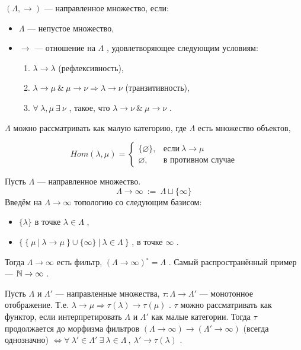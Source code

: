 \SSendp

\pagebreak

\SSsect[def] \( (\Lambda,\rightarrow) \) --- направленное множество, если:
\begin{itemize}[label=]
\item \( \Lambda \) --- непустое множество,   
\item \( \rightarrow \) --- отношение на \( \Lambda \) , удовлетворяющее следующим условиям:
\begin{enumerate}[label={\alph*)}]
\item \( \lambda \rightarrow \lambda \) (рефлексивность),
\item \( \lambda \rightarrow \mu ~\&~ \mu \rightarrow \nu \Rightarrow \lambda \rightarrow \nu \) (транзитивность),
\item \( \forall~\lambda,\mu ~\exists~ \nu \) , такое, что \( \lambda \rightarrow \nu ~\&~ \mu \rightarrow \nu \) .
\end{enumerate}
\end{itemize}

\( \Lambda \) можно рассматривать как малую категорию, где \( \Lambda \) есть множество объектов,

\[ Hom(\lambda,\mu)=
   \begin{cases}
   \{\varnothing\}, & \text{если} ~\lambda \rightarrow \mu \\
   \varnothing    , & \text{в противном случае}
   \end{cases}
\]

\SSsect[def] Пусть \( \Lambda \) --- направленное множество.
\[ \Lambda \rightarrow \infty ~:=~ \Lambda \sqcup \{\infty\} \]
Введём на \( \Lambda \rightarrow \infty \) топологию со следующим базисом:
\begin{itemize}[label=]
\item \( \{\lambda\} \) в точке \( \lambda \in \Lambda \) ,
\item \( \{~\{~\mu~|~\lambda\rightarrow\mu~\} \cup \{\infty\} ~|~ \lambda \in \Lambda ~\} \) , в точке \( \infty \) .
\end{itemize}
Тогда \( \Lambda \rightarrow \infty \) есть фильтр, \( (\Lambda \rightarrow \infty)^\circ=\Lambda \) . Самый распространённый пример --- \( \mathbb{N} \rightarrow \infty \) .

\SSsect Пусть \( \Lambda \) и \( \Lambda' \) --- направленные множества, \( \tau: \Lambda \rightarrow \Lambda' \) --- монотонное отображение. Т.е. \( \lambda \rightarrow \mu \Rightarrow \tau(\lambda) \rightarrow \tau(\mu) \) . \( \tau \) можно рассматривать как функтор, если интерпретировать \( \Lambda \) и \( \Lambda' \) как малые категории.
Тогда \( \tau \) продолжается до морфизма фильтров \( (\Lambda \rightarrow \infty) \rightarrow (\Lambda' \rightarrow \infty) \) (всегда однозначно) \( \Leftrightarrow  \forall~\lambda' \in \Lambda' ~\exists~\lambda \in \Lambda ~,~ \lambda' \rightarrow \tau(\lambda) \) .

